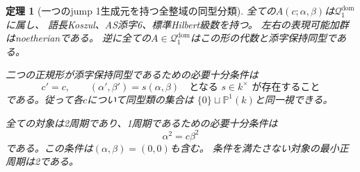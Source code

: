 \documentclass[11pt,a4paper]{ltjsarticle}
\newtheorem{theorem}{定理}[section]
\theoremstyle{definition}
\begin{document}
\begin{theorem}[一つのjump 1生成元を持つ全整域の同型分類]
\label{genidx:thm:one-light-classification}
全ての$A(c;\alpha,\beta)$は$\mathcal Q_1^{\mathrm{dom}}$に属し、
語長Koszul、AS添字6、標準Hilbert級数を持つ。
左右の表現可能加群はnoetherianである。
逆に全ての$A\in\mathcal Q_1^{\mathrm{dom}}$はこの形の代数と添字保持同型である。

二つの正規形が添字保持同型であるための必要十分条件は
\begin{equation}\label{genidx:eq:one-light-isomorphism}
c'=c,\qquad (\alpha',\beta')=s(\alpha,\beta)
\quad\text{となる }s\in k^\times\text{ が存在すること}
\end{equation}
である。従って各$c$について同型類の集合は
$\{0\}\sqcup\mathbb P^1(k)$と同一視できる。

全ての対象は2周期であり、1周期であるための必要十分条件は
\begin{equation}\label{genidx:eq:one-light-period-one}
\alpha^2=c\beta^2
\end{equation}
である。この条件は$(\alpha,\beta)=(0,0)$も含む。
条件を満たさない対象の最小正周期は2である。
\end{theorem}
\end{document}
